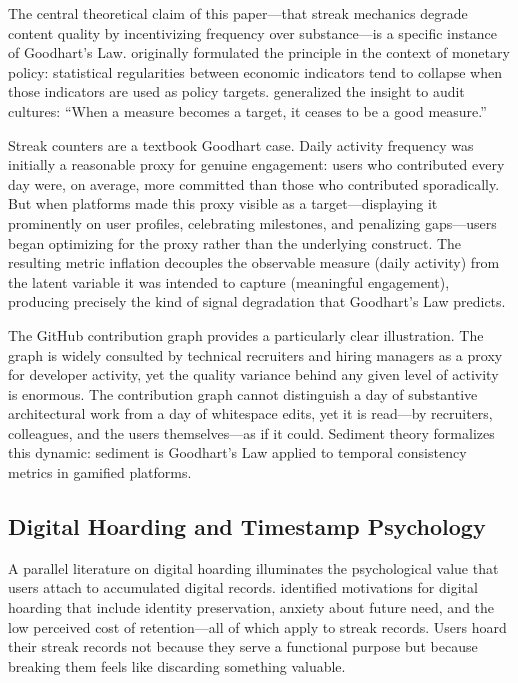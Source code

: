 \documentclass[12pt]{article}
\begin{document}
The central theoretical claim of this paper---that streak mechanics degrade content quality by incentivizing frequency over substance---is a specific instance of Goodhart's Law. \citet{Goodhart1975} originally formulated the principle in the context of monetary policy: statistical regularities between economic indicators tend to collapse when those indicators are used as policy targets. \citet{Strathern1997} generalized the insight to audit cultures: ``When a measure becomes a target, it ceases to be a good measure.''

Streak counters are a textbook Goodhart case. Daily activity frequency was initially a reasonable proxy for genuine engagement: users who contributed every day were, on average, more committed than those who contributed sporadically. But when platforms made this proxy visible as a target---displaying it prominently on user profiles, celebrating milestones, and penalizing gaps---users began optimizing for the proxy rather than the underlying construct. The resulting metric inflation decouples the observable measure (daily activity) from the latent variable it was intended to capture (meaningful engagement), producing precisely the kind of signal degradation that Goodhart's Law predicts.

The GitHub contribution graph provides a particularly clear illustration. The graph is widely consulted by technical recruiters and hiring managers as a proxy for developer activity, yet the quality variance behind any given level of activity is enormous. The contribution graph cannot distinguish a day of substantive architectural work from a day of whitespace edits, yet it is read---by recruiters, colleagues, and the users themselves---as if it could. Sediment theory formalizes this dynamic: sediment is Goodhart's Law applied to temporal consistency metrics in gamified platforms.

\subsection{Digital Hoarding and Timestamp Psychology}
\label{sec:lit-digital-hoarding}

A parallel literature on digital hoarding illuminates the psychological value that users attach to accumulated digital records. \citet{Sweeten2018} identified motivations for digital hoarding that include identity preservation, anxiety about future need, and the low perceived cost of retention---all of which apply to streak records. Users hoard their streak records not because they serve a functional purpose but because breaking them feels like discarding something valuable.
\end{document}

